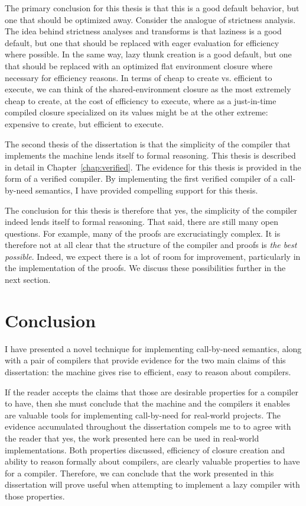The primary conclusion for this thesis is that this is a good default behavior,
but one that should be optimized away. Consider the analogue of strictness
analysis. The idea behind strictness analyses and transforms is that laziness is
a good default, but one that should be replaced with eager evaluation for
efficiency where possible. In the same way, lazy thunk creation is a good
default, but one that should be replaced with an optimized flat environment
closure where necessary for efficiency reasons. In terms of cheap to create vs. 
efficient to execute, we can think of the shared-environment closure as the most
extremely cheap to create, at the cost of efficiency to execute, where as a
just-in-time compiled closure specialized on its values might be at the other
extreme: expensive to create, but efficient to execute. 

The second thesis of the dissertation is that the simplicity of the compiler
that implements the \ce machine lends itself to formal reasoning. This thesis is
described in detail in Chapter~\ref{chap:verified}. The evidence for this thesis
is provided in the form of a verified compiler. By implementing the first
verified compiler of a call-by-need semantics, I have provided compelling
support for this thesis. 

The conclusion for this thesis is therefore that yes, the simplicity of the
compiler indeed lends itself to formal reasoning. That said, there are still
many open questions. For example, many of the proofs are excruciatingly complex.
It is therefore not at all clear that the structure of the compiler and proofs
is \emph{the best possible}. Indeed, we expect there is a lot of room for
improvement, particularly in the implementation of the proofs. We discuss these
possibilities further in the next section. 

\section{Conclusion}

I have presented a novel technique for implementing call-by-need semantics,
along with a pair of compilers that provide evidence for the two main claims of
this dissertation: the \ce machine gives rise to efficient, easy to reason about
compilers. 

If the reader accepts the claims that those are desirable properties for a
compiler to have, then she must conclude that the \ce machine and the compilers
it enables are valuable tools for implementing call-by-need for real-world
projects. The evidence accumulated throughout the dissertation compels me to
to agree with the reader that yes, the work presented here can be used in
real-world implementations. Both properties discussed, efficiency of closure
creation and ability to reason formally about compilers, are clearly valuable
properties to have for a compiler. Therefore, we can conclude that the work
presented in this dissertation will prove useful when attempting to implement a
lazy compiler with those properties. 



